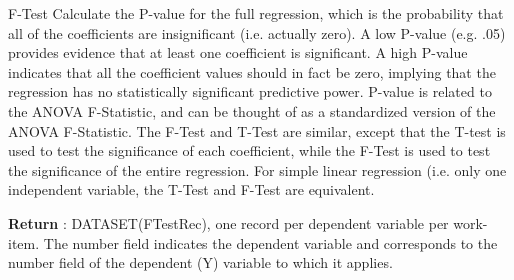 \par
F-Test Calculate the P-value for the full regression, which is the probability that all of the coefficients are insignificant (i.e. actually zero). A low P-value (e.g. .05) provides evidence that at least one coefficient is significant. A high P-value indicates that all the coefficient values should in fact be zero, implying that the regression has no statistically significant predictive power. P-value is related to the ANOVA F-Statistic, and can be thought of as a standardized version of the ANOVA F-Statistic. The F-Test and T-Test are similar, except that the T-test is used to test the significance of each coefficient, while the F-Test is used to test the significance of the entire regression. For simple linear regression (i.e. only one independent variable, the T-Test and F-Test are equivalent.
\par
\textbf{Return} : DATASET(FTestRec), one record per dependent variable per work-item. The number field indicates the dependent variable and corresponds to the number field of the dependent (Y) variable to which it applies. \\

